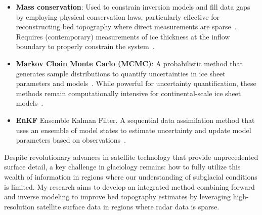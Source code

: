 \begin{itemize}
\begin{itemize}
            \item\textbf{Mass conservation}: Used to constrain inversion models and fill data gaps by employing physical conservation laws, particularly effective for reconstructing bed topography where direct measurements are sparse~\cite{Morlighem_2017, Morlighem_2020}. Requires (contemporary) measurements of ice thickness at the inflow boundary to properly constrain the system~\cite{Morlighem_Goldberg_2024}.
            \item\textbf{Markov Chain Monte Carlo (MCMC)}: A probabilistic method that generates sample distributions to quantify uncertainties in ice sheet parameters and models~\cite{Morlighem_Goldberg_2024}. While powerful for uncertainty quantification, these methods remain computationally intensive for continental-scale ice sheet models~\cite{Morlighem_Goldberg_2024}.
            \item\textbf{EnKF} Ensemble Kalman Filter. A sequential data assimilation method that uses an ensemble of model states to estimate uncertainty and update model parameters based on observations~\cite{Morlighem_Goldberg_2024}.
        \end{itemize}
\end{itemize} 
Despite revolutionary advances in satellite technology that provide unprecedented surface detail, a key challenge in glaciology remains: how to fully utilize this wealth of information in regions where our understanding of subglacial conditions is limited. My research aims to develop an integrated method combining forward and inverse modeling to improve bed topography estimates by leveraging high-resolution satellite surface data in regions where radar data is sparse.%

